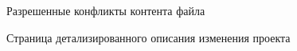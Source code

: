 \documentclass[a4paper,14pt]{extreport} %
\begin{document}
\begin{appendices}
\begin{figure}[H]
\caption{Разрешенные конфликты контента файла}
\label{resolved-conflict}
\end{figure}
\begin{figure}[H]
\caption{Страница детализированного описания изменения проекта}
\label{content-diff}
\end{figure}

\end{appendices}
\end{document}
